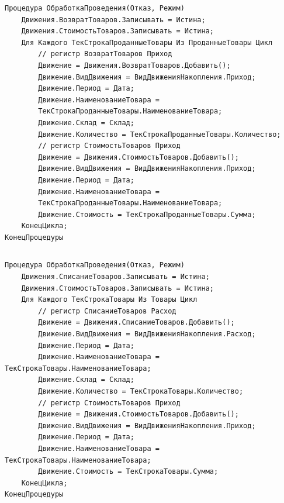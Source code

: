 \documentclass[12pt,a4paper]{article}
\begin{document}
\begin{appendices}
\begin{verbatim}
Процедура ОбработкаПроведения(Отказ, Режим)
    Движения.ВозвратТоваров.Записывать = Истина; 
    Движения.СтоимостьТоваров.Записывать = Истина;
    Для Каждого ТекСтрокаПроданныеТовары Из ПроданныеТовары Цикл
        // регистр ВозвратТоваров Приход
        Движение = Движения.ВозвратТоваров.Добавить();
        Движение.ВидДвижения = ВидДвиженияНакопления.Приход;
        Движение.Период = Дата;
        Движение.НаименованиеТовара =
        ТекСтрокаПроданныеТовары.НаименованиеТовара;
        Движение.Склад = Склад;
        Движение.Количество = ТекСтрокаПроданныеТовары.Количество;     
        // регистр СтоимостьТоваров Приход     
        Движение = Движения.СтоимостьТоваров.Добавить();
        Движение.ВидДвижения = ВидДвиженияНакопления.Приход;
        Движение.Период = Дата;
        Движение.НаименованиеТовара =
        ТекСтрокаПроданныеТовары.НаименованиеТовара;
        Движение.Стоимость = ТекСтрокаПроданныеТовары.Сумма;
    КонецЦикла;
КонецПроцедуры
\end{verbatim}

\begin{lstlisting}[caption=ОбработкаПроведения из модуля объекта Возвратной накладной]
\end{lstlisting}

\begin{verbatim}
Процедура ОбработкаПроведения(Отказ, Режим)
    Движения.СписаниеТоваров.Записывать = Истина;    
    Движения.СтоимостьТоваров.Записывать = Истина;
    Для Каждого ТекСтрокаТовары Из Товары Цикл
        // регистр СписаниеТоваров Расход
        Движение = Движения.СписаниеТоваров.Добавить();
        Движение.ВидДвижения = ВидДвиженияНакопления.Расход;
        Движение.Период = Дата;
        Движение.НаименованиеТовара = ТекСтрокаТовары.НаименованиеТовара;
        Движение.Склад = Склад;
        Движение.Количество = ТекСтрокаТовары.Количество;
        // регистр СтоимостьТоваров Приход     
        Движение = Движения.СтоимостьТоваров.Добавить();
        Движение.ВидДвижения = ВидДвиженияНакопления.Приход;
        Движение.Период = Дата;
        Движение.НаименованиеТовара = ТекСтрокаТовары.НаименованиеТовара;
        Движение.Стоимость = ТекСтрокаТовары.Сумма;
    КонецЦикла;
КонецПроцедуры
\end{verbatim}

\begin{lstlisting}[caption=ОбработкаПроведения из Накладной по истечению срока хранения]
\end{lstlisting}


\end{appendices}
\end{document}
